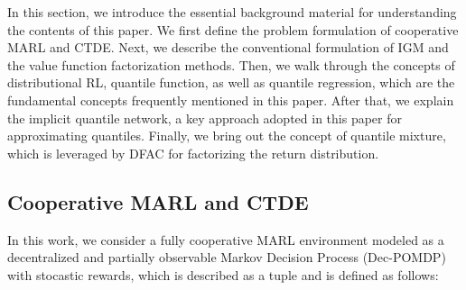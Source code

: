 \documentclass{article}
\begin{document}
In this section, we introduce the essential background material for understanding the contents of this paper. We first define the problem formulation of cooperative MARL and CTDE. Next, we describe the conventional formulation of IGM and the value function factorization methods. Then, we walk through the concepts of distributional RL, quantile function, as well as quantile regression, which are the fundamental concepts frequently mentioned in this paper. After that, we explain the implicit quantile network, a key approach adopted in this paper for approximating quantiles.  Finally, we bring out the concept of quantile mixture, which is leveraged by DFAC for factorizing the return distribution.



\subsection{Cooperative MARL and CTDE}
\label{subsec:background_cooperative_marl_and_ctde}

In this work, we consider a fully cooperative MARL environment modeled as a decentralized and partially observable Markov Decision Process (Dec-POMDP)~\cite{Oliehoek2016DECPOMDP} with stocastic rewards, which is described as a tuple  and is defined as follows:\\
\end{document}
